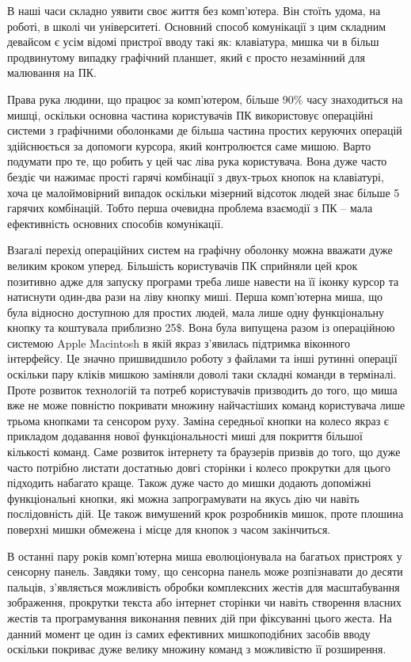 
В наші часи складно уявити своє життя без комп'ютера. Він стоїть удома, на роботі, в школі чи університеті. Основний способ комунікації з цим складним девайсом є усім відомі пристрої вводу такі як: клавіатура, мишка чи в більш продвинутому випадку графічний планшет, який є просто незамінний для малювання на ПК. 

Права рука людини, що працює за комп'ютером, більше 90\% часу знаходиться на мишці, оскільки основна частина користувачів ПК використовує операційні системи з графічними оболонками де більша частина простих керуючих операцій здійснюється за допомоги курсора, який контролюєтся саме мишою. Варто подумати про те, що робить у цей час ліва рука користувача. Вона дуже часто бездіє чи нажимає прості гарячі комбінації з двух-трьох кнопок на клавіатурі, хоча це малоймовірний випадок оскільки мізерний відсоток людей знає більше 5 гарячих комбінацій. Тобто перша очевидна проблема взаємодії з ПК – мала ефективність основних способів комунікації.

Взагалі перехід операційних систем на графічну оболонку можна вважати дуже великим кроком уперед. Більшість користувачів ПК сприйняли цей крок  позитивно адже для запуску програми треба лише навести на її іконку курсор та натиснути один-два рази на ліву кнопку миші. Перша комп'ютерна миша, що була відносно доступною для простих людей, мала лише одну функціональну кнопку та коштувала приблизно 25\$. Вона була випущена разом із операційною системою Apple Macintosh в якій якраз з'явилась підтримка віконного інтерфейсу. Це значно пришвидшило роботу з файлами та інші рутинні операції оскільки пару кліків мишкою заміняли доволі таки складні команди в терміналі. Проте розвиток технологій та потреб користувачів призводить до того, що миша вже не може повністю покривати множину найчастіших команд користувача лише трьома кнопками та сенсором руху. Заміна середньої кнопки на колесо якраз є прикладом додавання нової функціональності миші для покриття більшої кількості команд. Саме розвиток інтернету та браузерів призвів до того, що дуже часто потрібно листати достатнью довгі сторінки і колесо прокрутки для цього підходить набагато краще. Також дуже часто до мишки додають допоміжні функціональні кнопки, які можна запрограмувати на якусь дію чи навіть послідовність дій. Це також вимушений крок розробників мишок, проте плошина поверхні мишки обмежена і місце для кнопок з часом закінчиться. 

В останні пару років комп'ютерна миша еволюціонувала на багатьох пристроях у сенсорну панель. Завдяки тому, що сенсорна панель може розпізнавати до десяти пальців, з'являється можливість обробки комплексних жестів для масштабування зображення, прокрутки текста або інтернет сторінки чи навіть створення власних жестів та програмування виконання певних дій при фіксуванні цього жеста. На данний момент це один із самих ефективних мишкоподібних засобів вводу оскільки покриває дуже велику множину команд з можливістю її розширення.

